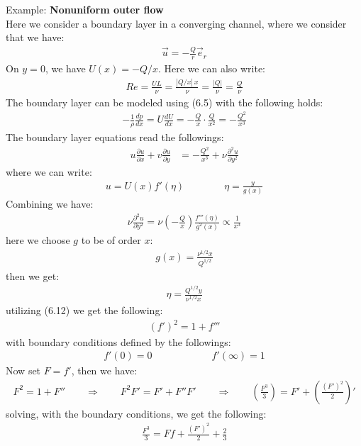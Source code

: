 \documentclass[11pt]{book}
\theoremstyle{break}
\theoremstyle{break}
\newcommand{\pd}{\partial}
\newcommand{\example}{\color{green}Example: \color{black}}
\begin{document}
\example \textbf{Nonuniform outer flow}\\
Here we consider a boundary layer in a converging channel, where we consider that we have:
\begin{align*}
\vec{u} =- \frac{Q}{r}\vec{e}_r
\end{align*}
On $y = 0$, we have $U(x) = -Q/x$. Here we can also write:
\begin{align*}
Re = \frac{UL}{\nu} = \frac{|Q/x|\, x}{\nu} = \frac{|Q|}{\nu} = \frac{Q}{\nu}
\end{align*}
The boundary layer can be modeled using (6.5) with the following holds:
\begin{align*}
 -\frac{1}{\rho} \frac{dp}{dx} = U \frac{dU}{dx} = -\frac{Q}{x} \cdot \frac{Q}{x^2} = -\frac{Q^2}{x^3} 
\end{align*}
The boundary layer equations read the followings:
\begin{align}
u \frac{\pd u}{\pd x} + v \frac{\pd u}{\pd y} &= -\frac{Q^2}{x^3} + \nu \frac{\pd^2 u}{\pd y^2}
\end{align}
where we can write:
\begin{align*}
u = U(x) f'(\eta) \qquad\qquad \eta = \frac{y}{g(x)}
\end{align*}
Combining we have:
\begin{align*}
\nu \frac{\pd^2 u}{\pd y^2} = \nu\left( - \frac{Q}{x}\right) \frac{f'''(\eta)}{g^2(x)} \propto \frac{1}{x^3}
\end{align*}
here we choose $g$ to be of order $x$:
\begin{align*}
g(x) = \frac{\nu^{1/2} x}{Q^{1/2}}
\end{align*}
then we get:
\begin{align*}
\eta = \frac{Q^{1/2}y}{\nu^{1/2}x}
\end{align*}
utilizing (6.12) we get the following:
\begin{align*}
(f')^2 = 1+ f'''
\end{align*}
with boundary conditions defined by the followings:
\begin{align*}
f'(0) = 0 \qquad\qquad\qquad f'(\infty) = 1
\end{align*}
Now set $F = f'$, then we have:
\begin{align*}
F^2 = 1+F'' \qquad \Rightarrow \qquad F^2F' = F' + F''F' \qquad \Rightarrow \qquad \left( \frac{F^3}{3}\right) = F' + \left( \frac{(F')^2}{2}\right)'
\end{align*}
solving, with the boundary conditions, we get the following:
\begin{align*}
\frac{F^3}{3} = Ff + \frac{(F')^2}{2}+ \frac{2}{3}
\end{align*}
\end{document}
